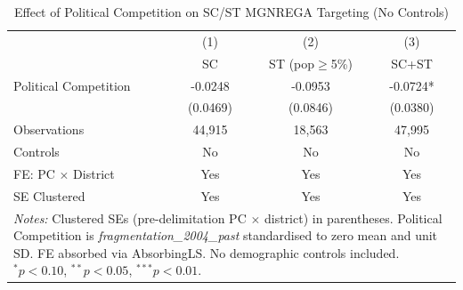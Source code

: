 \begin{table}[htbp]
\centering
\caption{Effect of Political Competition on SC/ST MGNREGA Targeting (No Controls)}
\label{tab:robustness_no_controls}
\begin{tabular}{lccc}
\hline\hline
 & (1) & (2) & (3) \\
 & SC & ST (pop$\geq$5\%) & SC+ST \\
\hline
Political Competition & -0.0248 & -0.0953 & -0.0724* \\
 & (0.0469) & (0.0846) & (0.0380) \\
\hline
Observations & 44,915 & 18,563 & 47,995 \\
Controls & No & No & No \\
FE: PC $\times$ District & Yes & Yes & Yes \\
SE Clustered & Yes & Yes & Yes \\
\hline\hline
\multicolumn{4}{p{11.0cm}}{\footnotesize \textit{Notes:} Clustered SEs (pre-delimitation PC $\times$ district) in parentheses. Political Competition is \textit{fragmentation\_2004\_past} standardised to zero mean and unit SD. FE absorbed via AbsorbingLS. No demographic controls included. $^{*}p<0.10$, $^{**}p<0.05$, $^{***}p<0.01$.}
\end{tabular}
\end{table}